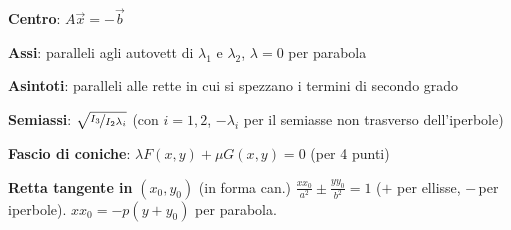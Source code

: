 \textbf{Centro}: $A\vec{x} = -\vec{b}$

\textbf{Assi}: paralleli agli autovett di $\lambda_1$ e $\lambda_2$, $\lambda=0$ per parabola

\textbf{Asintoti}: paralleli alle rette in cui si spezzano i termini di secondo grado

\textbf{Semiassi}: $\sqrt{\nicefrac{I_3}{I_2\lambda_i}}$ (con $i=1,2$, $-\lambda_i$ per il semiasse non trasverso dell'iperbole)

\textbf{Fascio di coniche}: $\lambda F(x,y) + \mu G(x,y) = 0$ (per 4 punti)

\textbf{Retta tangente in} {\boldmath$(x_0,y_0)$} (in forma can.) $\frac{xx_0}{a^2} \pm \frac{yy_0}{b^2} = 1$ ($+$ per ellisse, $-\,$per iperbole). $xx_0 = -p(y+y_0)$ per parabola.